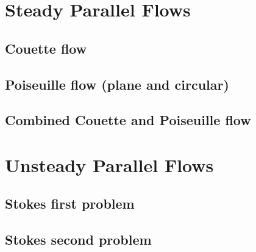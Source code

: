 \documentclass[oneside,a4paper,11pt]{report}
\begin{document}
\section{Steady Parallel Flows}

\subsection{Couette flow} 

\subsection{Poiseuille flow (plane and circular)}

\subsection{Combined Couette and Poiseuille flow}

\section{Unsteady Parallel Flows}

\subsection{Stokes first problem}

\subsection{Stokes second problem}

\end{document}
